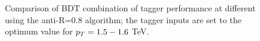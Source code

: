 \begin{figure}
\begin{center}
\caption{Comparison of BDT combination of tagger performance at different \pt using the anti-\kT R=0.8 algorithm; the tagger inputs are set to the optimum value for $p_T=1.5-1.6$ TeV.}
\label{fig:ptcomparison_top_optOnce}
\end{center}
\end{figure}


